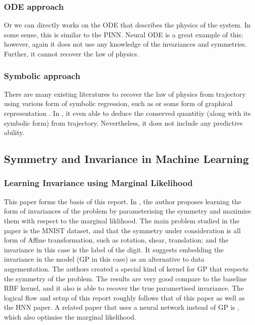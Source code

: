 \documentclass{statsmsc}
\begin{document}
\subsubsection{ODE approach}
Or we can directly works on the ODE that describes the physics of the system. 
In some sense, this is similar to the PINN. 
Neural ODE \cite{NeuralODE} is a great example of this; 
however, again it does not use any knowledge of the invariances and symmetries.
Further, it cannot recover the law of physics. 

\subsubsection{Symbolic approach}
There are many existing literatures to recover the law of physics from trajectory using various form of symbolic regression, such as \cite{Udrescu2020, Papastamatiou2022} or some form of graphical representation \cite{GraphSymbolicPhysics, flexiblePhysics}.
In \cite{Liu2021}, it even able to deduce the conserved quantitiy (along with its symbolic form) from trajectory.
Nevertheless, it does not include any predictive ability.

\subsection{Symmetry and Invariance in Machine Learning}

\subsubsection{Learning Invariance using Marginal Likelihood}
This paper forms the basis of this report.
In \cite{Mark2017}, the author proposes learning the form of invariances of the problem by parameterising the symmetry and maximise them with respect to the marginal liklihood.
The main problem studied in the paper is the MNIST dataset, and that the symmetry under consideration is all form of Affine transformation, such as rotation, shear, translation; and the invariance in this case is the label of the digit. 
It suggests embedding the invariance in the model (GP in this case) as an alternative to data augementation.
The authors created a special kind of kernel for GP that respects the symmetry of the problem.
The results are very good compare to the baseline RBF kernel, and it also is able to recover the true paramertised invariance. 
The logical flow and setup of this report roughly follows that of this paper as well as the HNN paper. 
A related paper that uses a neural network instead of GP is \cite{Tycho2021}, which also optimise the marginal likelihood.
\end{document}
